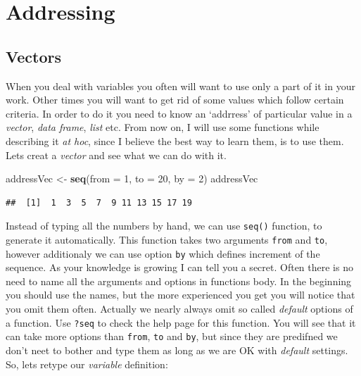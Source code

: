 \documentclass[]{book}
\newenvironment{Shaded}{\begin{snugshade}}{\end{snugshade}}
\newcommand{\KeywordTok}[1]{\textcolor[rgb]{0.12,0.11,0.11}{\textbf{#1}}}
\newcommand{\DataTypeTok}[1]{\textcolor[rgb]{0.00,0.34,0.68}{#1}}
\newcommand{\DecValTok}[1]{\textcolor[rgb]{0.69,0.50,0.00}{#1}}
\newcommand{\StringTok}[1]{\textcolor[rgb]{0.75,0.01,0.01}{#1}}
\newcommand{\NormalTok}[1]{\textcolor[rgb]{0.12,0.11,0.11}{#1}}
\theoremstyle{definition}
\theoremstyle{definition}
\theoremstyle{definition}
\theoremstyle{remark}
\begin{document}
\section{Addressing}\label{addressing}

\subsection{Vectors}\label{vectors}

When you deal with variables you often will want to use only a part of
it in your work. Other times you will want to get rid of some values
which follow certain criteria. In order to do it you need to know an
`addrress' of particular value in a \emph{vector}, \emph{data frame},
\emph{list} etc. From now on, I will use some functions while describing
it \emph{at hoc}, since I believe the best way to learn them, is to use
them. Lets creat a \emph{vector} and see what we can do with it.

\begin{Shaded}
\begin{Highlighting}[]
\NormalTok{addressVec <-}\StringTok{ }\KeywordTok{seq}\NormalTok{(}\DataTypeTok{from =} \DecValTok{1}\NormalTok{, }\DataTypeTok{to =} \DecValTok{20}\NormalTok{, }\DataTypeTok{by =} \DecValTok{2}\NormalTok{)}
\NormalTok{addressVec}
\end{Highlighting}
\end{Shaded}

\begin{verbatim}
##  [1]  1  3  5  7  9 11 13 15 17 19
\end{verbatim}

Instead of typing all the numbers by hand, we can use \texttt{seq()}
function, to generate it automatically. This function takes two
arguments \texttt{from} and \texttt{to}, however additionaly we can use
option \texttt{by} which defines increment of the sequence. As your
knowledge is growing I can tell you a secret. Often there is no need to
name all the arguments and options in functions body. In the beginning
you should use the names, but the more experienced you get you will
notice that you omit them often. Actually we nearly always omit so
called \emph{default} options of a function. Use \texttt{?seq} to check
the help page for this function. You will see that it can take more
options than \texttt{from}, \texttt{to} and \texttt{by}, but since they
are predifned we don't neet to bother and type them as long as we are OK
with \emph{default} settings. So, lets retype our \emph{variable}
definition:
\end{document}
